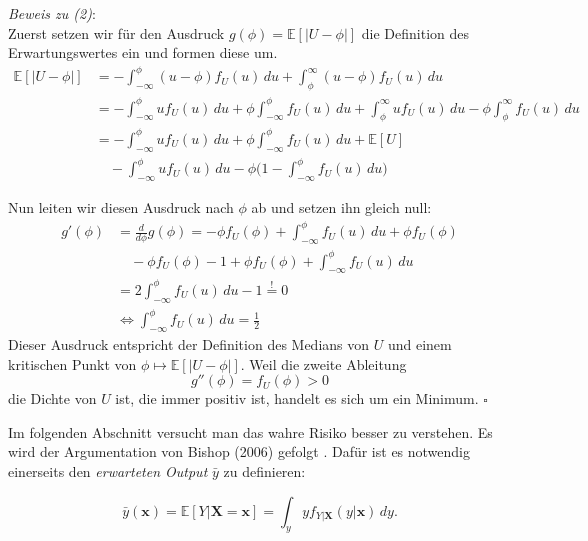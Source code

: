 \textit{Beweis zu (2)}: \\
Zuerst setzen wir f\"ur den Ausdruck $g(\phi) = \mathbb{E}[|U-\phi|]$ die Definition des Erwartungswertes ein und formen diese um.
\begin{equation*}
	\begin{split}
		\mathbb{E}[|U-\phi|]  & = -\int_{-\infty}^{\phi}(u-\phi)f_U(u)  \,du + \int_{\phi}^{\infty}(u-\phi)f_U(u)  \,du \\\
		& = - \int_{-\infty}^{\phi}uf_U(u)  \,du + \phi \int_{-\infty}^{\phi}f_U(u)  \,du + \int_{\phi}^{\infty}uf_U(u)  \,du -\phi \int_{\phi}^{\infty}f_U(u)  \,du \\\
		& = - \int_{-\infty}^{\phi}uf_U(u) \,du + \phi \int_{-\infty}^{\phi}f_U(u) \,du + \mathbb{E}[U] \\\
		& \quad - \int_{-\infty}^{\phi}uf_U(u) \,du - \phi \bigl(1 - \int_{-\infty}^{\phi}f_U(u) \,du \bigr)
	\end{split}
\end{equation*}

Nun leiten wir diesen Ausdruck nach $\phi$ ab und setzen ihn gleich null:
\begin{equation*}
	\begin{split}
		g'(\phi) & = \frac{d}{d\phi}g(\phi) = -\phi f_U(\phi) + \int_{-\infty}^{\phi}f_U(u) \,du + \phi f_U(\phi) \\\
		& \quad - \phi f_U(\phi) - 1 + \phi f_U(\phi) + \int_{-\infty}^{\phi}f_U(u) \,du \\\
		& = 2\int_{-\infty}^{\phi}f_U(u) \,du - 1 \overset{!}{=} 0 \\\
		& \Leftrightarrow \int_{-\infty}^{\phi}f_U(u) \,du = \frac{1}{2}
	\end{split}
\end{equation*}
Dieser Ausdruck entspricht der Definition des Medians von $U$ und einem kritischen Punkt von $\phi \mapsto \mathbb{E}[|U - \phi|]$. Weil die zweite Ableitung
$$ g''(\phi) = f_U(\phi) > 0 $$
die Dichte von $U$ ist, die immer positiv ist, handelt es sich um ein Minimum. $\square$



Im folgenden Abschnitt versucht man das wahre Risiko besser zu verstehen. Es wird der Argumentation von Bishop (2006) gefolgt \cite[Seiten 147 bis 152]{bishop}.
Daf\"ur ist es notwendig einerseits den \textit{erwarteten Output} $\bar{y}$ zu definieren:

$$ \bar{y}(\mathbf{x}) = \mathbb{E}[Y|\mathbf{X}=\mathbf{x}] = \int_y y f_{Y|\mathbf{X}}(y|\mathbf{x}) \, dy.$$

